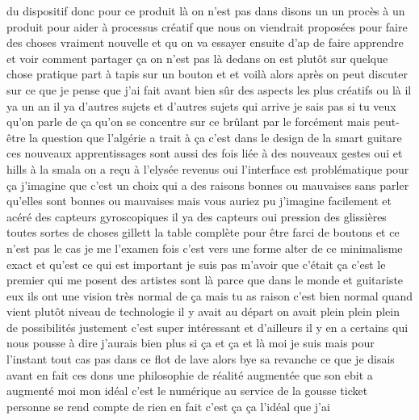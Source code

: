  du dispositif donc pour ce produit là on n'est pas dans disons un un procès à un produit pour aider à processus créatif que nous on viendrait proposées pour faire des choses vraiment nouvelle et qu on va essayer ensuite d'ap de faire apprendre et voir comment partager ça on n'est pas là dedans on est plutôt sur quelque chose pratique part à tapis sur un bouton et et voilà alors après on peut discuter sur ce que je pense que j'ai fait avant bien sûr des aspects les plus créatifs ou là il ya un an il ya d'autres sujets et d'autres sujets qui arrive je sais pas si tu veux qu'on parle de ça qu'on se concentre sur ce brûlant par le forcément mais peut-être la question que l'algérie a trait à ça c'est dans le design de la smart guitare ces nouveaux apprentissages sont aussi des fois liée à des nouveaux gestes oui et hills à la smala on a reçu à l'elysée revenus oui l'interface est problématique pour ça j'imagine que c'est un choix qui a des raisons bonnes ou mauvaises sans parler qu'elles sont bonnes ou mauvaises mais vous auriez pu j'imagine facilement et acéré des capteurs gyroscopiques il ya des capteurs oui pression des glissières toutes sortes de choses gillett la table complète pour être farci de boutons et ce n'est pas le cas je me l'examen fois c'est vers une forme alter de ce minimalisme exact et qu'est ce qui est important je suis pas m'avoir que c'était ça c'est le premier qui me posent des artistes sont là parce que dans le monde et guitariste eux ils ont une vision très normal de ça mais tu as raison c'est bien normal quand vient plutôt niveau de technologie il y avait au départ on avait plein plein plein de possibilités justement c'est super intéressant et d'ailleurs il y en a certains qui nous pousse à dire j'aurais bien plus si ça et ça et là moi je suis mais pour l'instant tout cas pas dans ce flot de lave alors bye sa revanche ce que je disais avant en fait ces dons une philosophie de réalité augmentée que son ebit a augmenté moi mon idéal c'est le numérique au service de la gousse ticket personne se rend compte de rien en fait c'est ça ça l'idéal que j'ai 
